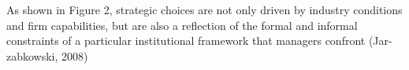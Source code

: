 As shown in Figure 2, strategic choices are not only driven by industry conditions and firm capabilities, but are also a reflection of the formal and informal constraints of a particular institutional framework that managers confront (Jar- zabkowski, 2008)
